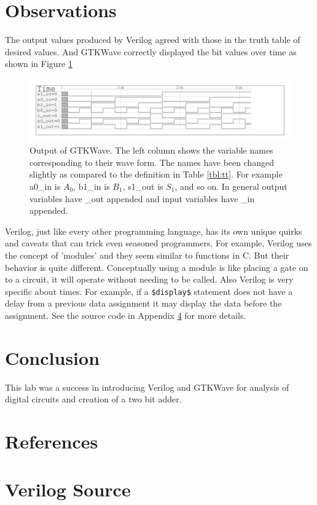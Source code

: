 \documentclass[12pt]{article}
\begin{document}

\section{Observations}

The output values produced by Verilog agreed with those in the
truth table of desired values.
And GTKWave correctly displayed the bit values over time
as shown in Figure \ref{fig:wave}

\begin{figure}
\center
\includegraphics[scale=0.7]{verilog/gtkwave-output}
\caption{Output of GTKWave.
The left column shows the variable names corresponding to their wave form.
The names have been changed slightly as compared to the definition in Table \ref{tbl:tt}.
For example a0\_in is $A_0$, b1\_in is $B_1$, s1\_out is $S_1$, and so on.
In general output variables have \_out appended and input variables have \_in appended.
}
\label{fig:wave}
\end{figure}

Verilog, just like every other programming language, has its own
unique quirks and caveats that can trick even seasoned programmers.
For example, Verilog uses the concept of 'modules' and they
seem similar to functions in C.
But their behavior is quite different.
Conceptually using a module is like placing a gate on to a circuit,
it will operate without needing to be called.
Also Verilog is very specific about times.
For example, if a \verb+$display$+ statement does not have a delay
from a previous data assignment it may display the data before the
assignment.
See the source code in Appendix \ref{sec:source} for more details.


\section{Conclusion}

This lab was a success in introducing Verilog and GTKWave for analysis
of digital circuits and creation of a two bit adder.


\renewcommand*{\refname}{\vspace{-8mm}}
\section{References}



\appendix

\clearpage
\section{Verilog Source}
\label{sec:source}

{\footnotesize

}
\end{document}
